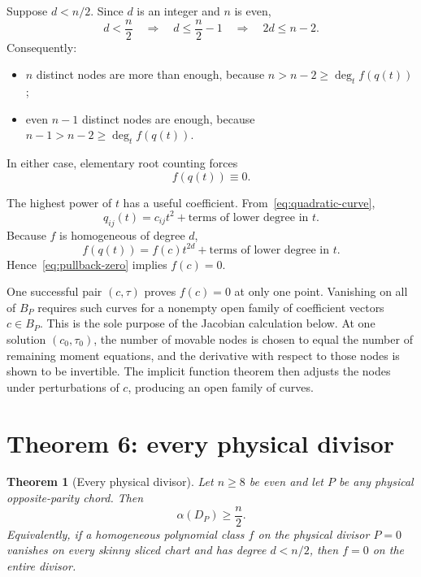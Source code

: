 \documentclass[11pt]{article}
\newtheorem{theorem}{Theorem}
\theoremstyle{definition}
\newcommand{\initial}{\alpha}
\begin{document}
Suppose $d<n/2$.  Since $d$ is an integer and $n$ is even,
\begin{equation}
d<\frac n2
\quad\Longrightarrow\quad
d\le\frac n2-1
\quad\Longrightarrow\quad
2d\le n-2.
\label{eq:integer-degree}
\end{equation}
Consequently:
\begin{itemize}
\item $n$ distinct nodes are more than enough, because $n>n-2\ge\deg_t f(q(t))$;
\item even $n-1$ distinct nodes are enough, because $n-1>n-2\ge\deg_t f(q(t))$.
\end{itemize}
In either case, elementary root counting forces
\begin{equation}
f(q(t))\equiv0.
\label{eq:pullback-zero}
\end{equation}

The highest power of $t$ has a useful coefficient.  From~\eqref{eq:quadratic-curve},
\[
q_{ij}(t)=c_{ij}t^2+\text{terms of lower degree in }t.
\]
Because $f$ is homogeneous of degree $d$,
\begin{equation}
f(q(t))=f(c)t^{2d}+\text{terms of lower degree in }t.
\label{eq:leading-fc}
\end{equation}
Hence~\eqref{eq:pullback-zero} implies $f(c)=0$.

One successful pair $(c,\tau)$ proves $f(c)=0$ at only one point.  Vanishing on all of $B_P$ requires such curves for a nonempty open family of coefficient vectors $c\in B_P$.  This is the sole purpose of the Jacobian calculation below.  At one solution $(c_0,\tau_0)$, the number of movable nodes is chosen to equal the number of remaining moment equations, and the derivative with respect to those nodes is shown to be invertible.  The implicit function theorem then adjusts the nodes under perturbations of $c$, producing an open family of curves.

\section{Theorem 6: every physical divisor}

\begin{theorem}[Every physical divisor]
Let $n\ge8$ be even and let $P$ be any physical opposite-parity chord.  Then
\begin{equation}
\initial(D_P)\ge\frac n2.
\label{eq:thm6-alpha}
\end{equation}
Equivalently, if a homogeneous polynomial class $f$ on the physical divisor $P=0$ vanishes on every skinny sliced chart and has degree $d<n/2$, then $f=0$ on the entire divisor.
\end{theorem}
\end{document}
